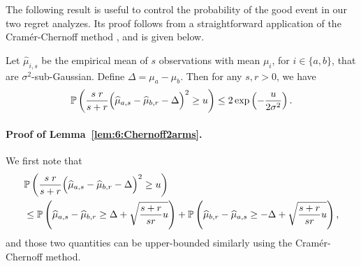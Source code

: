 The following result is useful to control the probability of the good event in our two regret analyzes.
Its proof follows from a straightforward application of the Cram\'er-Chernoff method \cite{Boucheron2013}, and is given below.

\begin{lemma}\label{lem:6:Chernoff2arms}
\begin{leftbar}[lemmabar]  %
    Let $\widehat{\mu}_{i,s}$ be the empirical mean of $s$ \iid{} observations with mean $\mu_i$, for $i \in \{a,b\}$, that are $\sigma^2$-sub-Gaussian. Define $\Delta = \mu_a - \mu_b$. Then for any $s,r > 0$, we have
    \begin{equation}
        \mathbb{P}\left(\frac{s \; r}{s+r}\Big(\widehat{\mu}_{a,s} - \widehat{\mu}_{b,r} - \Delta\Big)^2 \geq u \right) \leq 2\exp\left(- \frac{u}{2\sigma^2}\right).
    \end{equation}
\end{leftbar}  %
\end{lemma}


\paragraph{Proof of Lemma~\ref{lem:6:Chernoff2arms}.}

We first note that
\begin{align}\label{eq:6:Preparation}
	&\mathbb{P}\left(\frac{s \; r}{s+r}\Big(\widehat{\mu}_{a,s} - \widehat{\mu}_{b,r} - \Delta\Big)^2 \geq u \right) \nonumber\\
	&\leq \mathbb{P}\left(\widehat{\mu}_{a,s} - \widehat{\mu}_{b,r} \geq \Delta + \sqrt{\frac{s+r}{sr}u} \right) + \mathbb{P}\left(\widehat{\mu}_{b,r} - \widehat{\mu}_{a,s} \geq -\Delta + \sqrt{\frac{s+r}{sr}u} \right),
\end{align}
and those two quantities can be upper-bounded similarly using the Cram\'er-Chernoff method.

